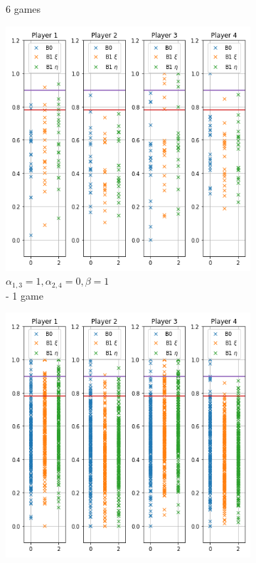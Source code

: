 \begin{figure}[ht]
\begin{subfigure}{0.5\textwidth}
    \caption{6 games}
    \label{fig:18}
\end{subfigure}
\caption{Subgame B.0/B.1}
\label{fig:15}
	\centering
	\begin{subfigure}{0.32\textwidth}
	    \centering
	    \includegraphics[width=1\linewidth]{Bilder/exp1.png}
	    \caption{$\alpha_{1,3}=1,\alpha_{2,4}=0,\beta=1$ \\- 1 game}
	    \label{fig:30}
    \end{subfigure}%
	\begin{subfigure}{0.32\textwidth}
	    \centering
	    \includegraphics[width=1\linewidth]{Bilder/exp2.png}

\end{subfigure}
\end{figure}
